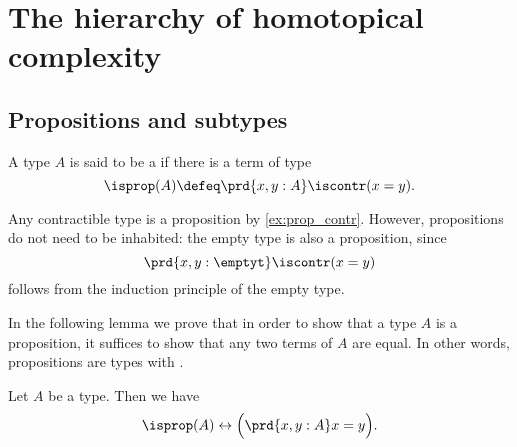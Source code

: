 \chapter{The hierarchy of homotopical complexity}


\section{Propositions and subtypes}

\begin{defn}
A type $A$ is said to be a  if there is a term of type
\begin{equation*}
\isprop(A)\defeq\prd{x,y:A}\iscontr(x=y).
\end{equation*}
\end{defn}

\begin{eg}\label{eg:prop_contr}
Any contractible type is a proposition by \cref{ex:prop_contr}. However, propositions do not need to be inhabited: the empty type is also a proposition, since
\begin{equation*}
\prd{x,y:\emptyt}\iscontr(x=y)
\end{equation*}
follows from the induction principle of the empty type.
\end{eg}

In the following lemma we prove that in order to show that a type $A$ is a proposition, it suffices to show that any two terms of $A$ are equal. In other words, propositions are types with .

\begin{lem}\label{lem:isprop_eq}
Let $A$ be a type. Then we have
\begin{equation*}
\isprop(A)\leftrightarrow \Big(\prd{x,y:A}x=y\Big).
\end{equation*}
\end{lem}

